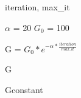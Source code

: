 \documentclass{article}
\begin{document}
\begin{algorithm}
\begin{algorithmic}[1]
    \REQUIRE iteration, max\_it

    \STATE $\alpha$ = 20
    \STATE $G_0$ = 100

    \STATE G = $G_0 * e^{-\alpha * \frac{iteration}{max\_it}}$

    \RETURN G
\end{algorithmic}
\caption{Gconstant}
\end{algorithm}
 
\end{document}
